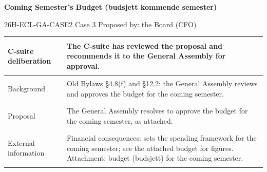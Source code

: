 \documentclass{../../../Common/Latex/Templates/rapport}
\begin{document}
\reportmainmatter
\small
\setlength{\parindent}{0pt}
\setlength{\tabcolsep}{6pt}
\renewcommand{\arraystretch}{1.2}

\begin{center}
  {\Large\bfseries Coming Semester's Budget (budsjett kommende semester)}\par
  \vspace{0.15cm}
  {\normalsize 26H-ECL-GA-CASE2 \textperiodcentered{} Case 3 \textperiodcentered{} Proposed by: the Board (CFO)}\par
  \vspace{0.1cm}
  {\small \meetingline}\par
\end{center}

\vspace{0.3cm}
\begin{tabularx}{\textwidth}{|>{\bfseries\raggedright\arraybackslash}p{4.2cm}|X|}
  \hline
  C-suite deliberation & The C-suite has reviewed the proposal and recommends it to the General Assembly for approval.                                                                            \\
  \hline
  Background           & Old Bylaws \S4.8(f) and \S12.2: the General Assembly reviews and approves the budget for the coming semester.                                                            \\
  \hline
  Proposal             & The General Assembly resolves to approve the budget for the coming semester, as attached.                                                                                \\
  \hline
  External information & Financial consequences: sets the spending framework for the coming semester; see the attached budget for figures. Attachment: budget (budsjett) for the coming semester. \\
  \hline
\end{tabularx}
\end{document}
